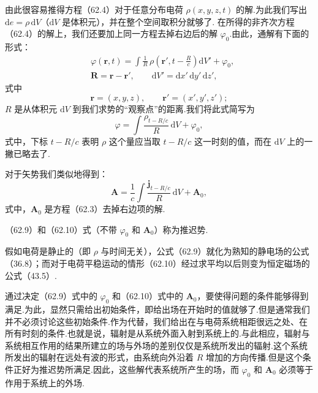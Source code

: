 由此很容易推得方程（62.4）对于任意分布电荷 $\rho(x,y,z,t)$ 的解.为此我们写出 $\mathrm{d}e=\rho\,\mathrm{d}V$（$\mathrm{d}V$ 是体积元），并在整个空间取积分就够了. 在所得的非齐次方程（62.4）的解上，我们还要加上同一方程去掉右边后的解 $\varphi_0$.由此，通解有下面的形式：
\begin{equation}
\begin{aligned}
  &\varphi(\boldsymbol{r},t)=\int\frac{1}{R}\,
  \rho\left(\boldsymbol{r}',t-\frac{R}{c}\right)\mathrm{d}V'+\varphi_0,\\
  &\boldsymbol{R}=\boldsymbol{r}-\boldsymbol{r}',\qquad
  \mathrm{d}V'=\mathrm{d}x'\,\mathrm{d}y'\,\mathrm{d}z',
\end{aligned}
\end{equation}
式中
\begin{equation*}
  \boldsymbol{r}=(x,y,z),\qquad
  \boldsymbol{r}'=(x',y',z');
\end{equation*}
$R$ 是从体积元 $\mathrm{d}V$ 到我们求势的“观察点”的距离.我们将此式简写为
\begin{equation}
  \varphi=\int\frac{\rho_{t-R/c}}{R}\,\mathrm{d}V+\varphi_0,
\end{equation}
式中，下标 $t-R/c$ 表明 $\rho$ 这个量应当取 $t-R/c$ 这一时刻的值，而在 $\mathrm{d}V$ 上的一撇已略去了.

对于矢势我们类似地得到：
\begin{equation}
  \boldsymbol{A}=\frac{1}{c}\int\frac{\boldsymbol{j}_{t-R/c}}{R}\,\mathrm{d}V
  +\boldsymbol{A}_0,
\end{equation}
式中，$\boldsymbol{A}_0$ 是方程（62.3）去掉右边项的解.

（62.9）和（62.10）式（不带 $\varphi_0$ 和 $\boldsymbol{A}_0$）称为推迟势.

假如电荷是静止的（即 $\rho$ 与时间无关），公式（62.9）就化为熟知的静电场的公式（36.8）；而对于电荷平稳运动的情形（62.10）经过求平均以后则变为恒定磁场的公式（43.5）.

通过决定（62.9）式中的 $\varphi_0$ 和（62.10）式中的 $\boldsymbol{A}_0$，要使得问题的条件能够得到满足.为此，显然只需给出初始条件，即给出场在开始时的值就够了.但是通常我们并不必须讨论这些初始条件.作为代替，我们给出在与电荷系统相距很远之处、在所有时刻的条件.也就是说，辐射是从系统外面入射到系统上的.与此相应，辐射与系统相互作用的结果所建立的场与外场的差别仅仅是系统所发出的辐射.这个系统所发出的辐射在远处有波的形式，由系统向外沿着 $R$ 增加的方向传播.但是这个条件正好为推迟势所满足.因此，这些解代表系统所产生的场，而 $\varphi_0$ 和 $\boldsymbol{A}_0$ 必须等于作用于系统上的外场.

